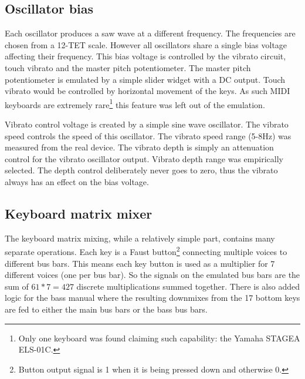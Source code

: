 \documentclass[11pt,a4paper]{article}
\begin{document}



\subsection{Oscillator bias}
\label{section:oscillator-bias}

Each oscillator produces a saw wave at a different frequency. The frequencies are chosen from a 12-TET scale. However all oscillators share a single bias voltage affecting their frequency. This bias voltage is controlled by the vibrato circuit, touch vibrato and the master pitch potentiometer. The master pitch potentiometer is emulated by a simple slider widget with a DC output. Touch vibrato would be controlled by horizontal movement of the keys. As such MIDI keyboards are extremely rare\footnote{Only one keyboard was found claiming such capability: the Yamaha STAGEA ELS-01C.} this feature was left out of the emulation.

Vibrato control voltage is created by a simple sine wave oscillator. The vibrato speed controls the speed of this oscillator. The vibrato speed range (5-8Hz) was measured from the real device. The vibrato depth is simply an attenuation control for the vibrato oscillator output. Vibrato depth range was empirically selected. The depth control deliberately never goes to zero, thus the vibrato always has an effect on the bias voltage.

\subsection{Keyboard matrix mixer}

The keyboard matrix mixing, while a relatively simple part, contains many separate operations. Each key is a Faust button\footnote{Button output signal is 1 when it is being pressed down and otherwise 0.} connecting multiple voices to different bus bars. This means each key button is used as a multiplier for 7 different voices (one per bus bar). So the signals on the emulated bus bars are the sum of $61*7 = 427$ discrete multiplications summed together. There is also added logic for the bass manual where the resulting downmixes from the 17 bottom keys are fed to either the main bus bars or the bass bus bars.
\end{document}
